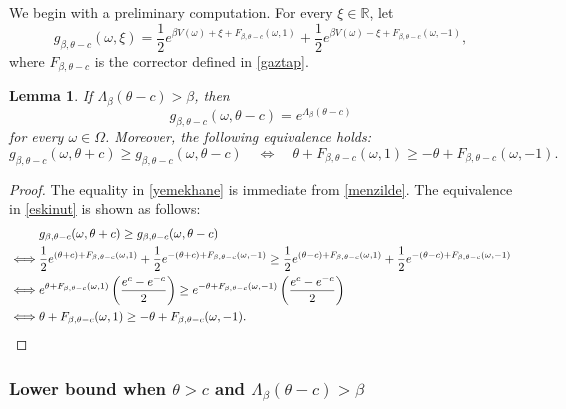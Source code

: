 \documentclass[a4paper]{amsart}
\numberwithin{equation}{section}
\theoremstyle{plain}
\newtheorem{lemma}[theorem]{\sc Lemma}
\theoremstyle{remark}
\begin{document}
{}{We begin with a preliminary computation.}
For every $\xi\in\mathbb{R}$, let
$$g_{\beta,\theta-c}(\omega,\xi) = \frac1{2}e^{\beta V(\omega) + \xi + F_{\beta,\theta-c}(\omega,1)} + \frac1{2}e^{\beta V(\omega) - \xi + F_{\beta,\theta-c}(\omega,-1)},$$
where $F_{\beta,\theta-c}$ is the corrector defined in \eqref{gaztap}.

\begin{lemma}\label{derin}
If $\Lambda_\beta(\theta - c) > \beta$, then
\begin{equation}\label{yemekhane}
g_{\beta,\theta-c}(\omega,\theta-c) = e^{\Lambda_\beta(\theta-c)}
\end{equation}
for every $\omega\in\Omega$. Moreover, the following equivalence holds:
\begin{equation}\label{eskinut}
g_{\beta,\theta-c}(\omega,\theta+c) \ge g_{\beta,\theta-c}(\omega,\theta-c)\quad\iff\quad\theta + F_{\beta,\theta-c}(\omega,1) \ge -\theta + F_{\beta,\theta-c}(\omega,-1).
\end{equation}
\end{lemma}

\begin{proof}
The equality in \eqref{yemekhane} is immediate from \eqref{menzilde}. The equivalence in \eqref{eskinut} is shown as follows:
\begin{align}
&g_{\beta,\theta-c}(\omega,\theta+c) \ge g_{\beta,\theta-c}(\omega,\theta-c)\nonumber\\
\iff& \frac1{2}e^{(\theta +c) + F_{\beta,\theta-c}(\omega,1)} + \frac1{2}e^{- (\theta +c) + F_{\beta,\theta-c}(\omega,-1)} \ge \frac1{2}e^{(\theta -c) + F_{\beta,\theta-c}(\omega,1)} + \frac1{2}e^{- (\theta -c) + F_{\beta,\theta-c}(\omega,-1)}\nonumber\\
\iff& e^{\theta + F_{\beta,\theta-c}(\omega,1)}\left(\frac{e^c - e^{-c}}{2}\right) \ge e^{-\theta + F_{\beta,\theta-c}(\omega,-1)}\left(\frac{e^c - e^{-c}}{2}\right)\nonumber\\
\iff& \theta + F_{\beta,\theta-c}(\omega,1) \ge -\theta + F_{\beta,\theta-c}(\omega,-1)\nonumber.\qedhere
\end{align}
\end{proof}

\subsubsection{Lower bound when $\theta > c$ and $\Lambda_\beta(\theta - c) > \beta$}
\end{document}
